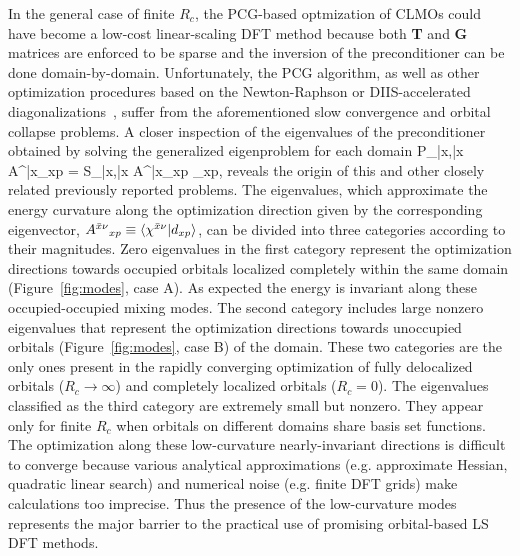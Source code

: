 \documentclass[aps,prl,twocolumn,reprint,amsmath,amssymb]{revtex4-1}
\begin{document}
In the general case of finite $R_c$, the PCG-based optmization of CLMOs could have become a low-cost linear-scaling DFT method because both \textbf{T} and \textbf{G} matrices are enforced to be sparse and the inversion of the preconditioner can be done domain-by-domain. Unfortunately, the PCG algorithm, as well as other optimization procedures based on the Newton-Raphson or DIIS-accelerated diagonalizations~\cite{stoll1980use}, suffer from the aforementioned slow convergence and orbital collapse problems. 
%
A closer inspection of the eigenvalues of the preconditioner obtained by solving the generalized eigenproblem for each domain 
%
\bea
P_{\bar{x}\mu,\bar{x}\nu} {A^{\bar{x}\nu}}_{xp} =  S_{\bar{x}\mu,\bar{x}\kappa} {A^{\bar{x}\kappa}}_{xp} \Lambda_{xp},
\label{eq:gev}
\eea
%
reveals the origin of this and other closely related previously reported problems. The eigenvalues, which approximate the energy curvature along the optimization direction  given by the corresponding eigenvector, ${A^{\bar{x}\nu}}_{xp} \equiv \langle \chi^{\bar{x}\nu} \vert d_{xp} \rangle$, can be divided into three categories according to their magnitudes. Zero eigenvalues in the first category represent the optimization directions towards occupied orbitals localized completely within the same domain (Figure~\ref{fig:modes}, case A). As expected the energy is invariant along these occupied-occupied mixing modes. The second category includes large nonzero eigenvalues that represent the optimization directions towards unoccupied orbitals (Figure~\ref{fig:modes}, case B) of the domain. These two categories are the only ones present in the rapidly converging optimization of fully delocalized orbitals ($R_c \rightarrow \infty$) and completely localized orbitals ($R_c = 0$). The eigenvalues classified as the third category are extremely small but nonzero. They appear only for finite $R_c$ when orbitals on different domains share basis set functions. 
The optimization along these low-curvature nearly-invariant directions is difficult to converge because various analytical approximations (e.g. approximate Hessian, quadratic linear search) and numerical noise (e.g. finite DFT grids) make calculations too imprecise. Thus the presence of the low-curvature modes represents the major barrier to the practical use of promising orbital-based LS DFT methods.
\end{document}
